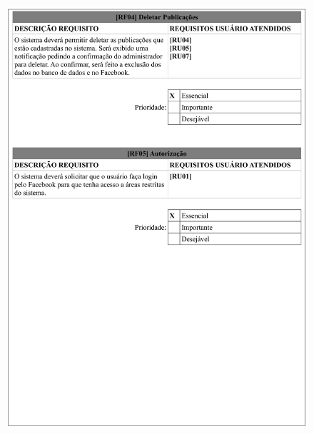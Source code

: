 \begin{figure}
    \includegraphics[width=\textwidth]{documentacao/ModeloArtefatos-03.jpg}
\end{figure}

